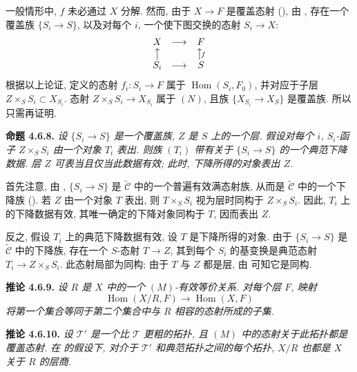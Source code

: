 一般情形中, \(f\) 未必通过 \(X\) 分解.
然而, 由于 \(X\to F\) 是覆盖态射
(),
由 ,
存在一个覆盖族 \(\{S_i\to S\}\),
以及对每个 \(i\), 一个使下图交换的态射 \(S_i\to X\):
\[
\begin{array}{ccc}
 X&\longrightarrow&F\cr
 \big\uparrow&&\big\uparrow\!{\scriptstyle f}\cr
 S_i&\longrightarrow&S
\end{array}
\]
根据以上论证, 
定义的态射 \(f_i:S_i\to F\) 属于 \(\operatorname{Hom}(S_i,F_0)\),
并对应于子层 \(Z\times_SS_i\subset X_{S_i}\).
态射 \(Z\times_SS_i\to X_{S_i}\) 属于 \((N)\),
且族 \(\{X_{S_i}\to X_S\}\) 是覆盖族.
所以只需再证明.

\medskip
\noindent{}\textbf{命题 4.6.8.}
\textit{设 \(\{S_i\to S\}\) 是一个覆盖族,
\(Z\) 是 \(S\) 上的一个层.
假设对每个 \(i\), \(S_i\)-函子 \(Z\times_SS_i\) 由一个对象 \(T_i\) 表出.
则族 \((T_i)\) 带有关于 \(\{S_i\to S\}\) 的一个典范下降数据.
层 \(Z\) 可表当且仅当此数据有效;
此时, 下降所得的对象表出 \(Z\).}

首先注意, 由 ,
\(\{S_i\to S\}\) 是 \(\widetilde{\mathscr C}\) 中的一个普遍有效满态射族,
从而是 \(\widetilde{\mathscr C}\) 中的一个下降族
().
若 \(Z\) 由一个对象 \(T\) 表出,
则 \(T\times_SS_i\) 视为层时同构于 \(Z\times_SS_i\).
因此, \(T_i\) 上的下降数据有效,
其唯一确定的下降对象同构于 \(T\), 因而表出 \(Z\).

反之, 假设 \(T_i\) 上的典范下降数据有效,
设 \(T\) 是下降所得的对象.
由于 \(\{S_i\to S\}\) 是 \(\widetilde{\mathscr C}\) 中的下降族,
存在一个 \(S\)-态射 \(T\to Z\),
其到每个 \(S_i\) 的基变换是典范态射 \(T_i\to Z\times_SS_i\).
此态射局部为同构; 由于 \(T\) 与 \(Z\) 都是层,
由  可知它是同构.

\medskip
\noindent{}\textbf{推论 4.6.9.}
\textit{设 \(R\) 是 \(X\) 中的一个 \((M)\)-有效等价关系.
对每个层 \(F\), 映射}
\[
 \operatorname{Hom}(X/R,F)\longrightarrow\operatorname{Hom}(X,F)
\]
\textit{将第一个集合等同于第二个集合中与 \(R\) 相容的态射所成的子集.}

\medskip
\noindent{}\textbf{推论 4.6.10.}
\textit{设 \(\mathcal T'\) 是一个比 \(\mathcal T\) 更粗的拓扑,
且 \((M)\) 中的态射关于此拓扑都是覆盖态射.
在  的假设下,
对介于 \(\mathcal T'\) 和典范拓扑之间的每个拓扑,
\(X/R\) 也都是 \(X\) 关于 \(R\) 的层商.}

